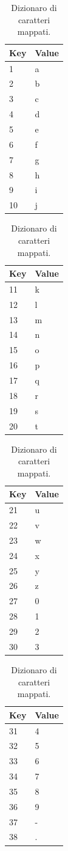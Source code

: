 \begin{table}[!ht]
    \centering
    \begin{tabular}[t]{ll}
    \toprule
    Key & Value \\
    \midrule
1 & a \\
2 & b \\
3 & c \\
4 & d \\
5 & e \\
6 & f \\
7 & g \\
8 & h \\
9 & i \\
10 & j \\
\bottomrule        

\end{tabular}
\begin{tabular}[t]{ll}
    \toprule
    Key & Value \\
    \midrule
11 & k \\
12 & l \\
13 & m \\
14 & n \\
15 & o \\
16 & p \\
17 & q \\
18 & r \\
19 & s \\
20 & t \\
\bottomrule        
\end{tabular}
\begin{tabular}[t]{ll}
    \toprule
    Key & Value \\
    \midrule
21 & u \\
22 & v \\
23 & w \\
24 & x \\
25 & y \\
26 & z \\
27 & 0 \\
28 & 1 \\
29 & 2 \\
30 & 3 \\
\bottomrule        
\end{tabular}
\begin{tabular}[t]{ll}
    \toprule
    Key & Value \\
    \midrule
31 & 4 \\
32 & 5 \\
33 & 6 \\
34 & 7 \\
35 & 8 \\
36 & 9 \\
37 & - \\
38 & . \\
\bottomrule        
    \end{tabular}
    \caption{Dizionaro di caratteri mappati. \label{tab:dict}}
\end{table}

